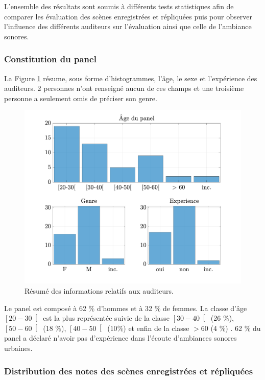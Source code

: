 L'ensemble des résultats sont soumis à différents tests statistiques afin de comparer les évaluation des scènes enregistrées et répliquées puis pour observer l'influence des différents auditeurs sur l'évaluation ainsi que celle de l'ambiance sonores.

\subsubsection{Constitution du panel}

La Figure \ref{fig:panelTest} résume, sous forme d'histogrammes, l'âge, le sexe et l'expérience des auditeurs. 2 personnes n'ont renseigné aucun de ces champs et une troisième personne a seulement omis de préciser son genre.\\

\begin{figure}[ht]
\centering
\includegraphics[width = .8\textwidth]{./figures/test_perceptif/testPerceptif_panel.pdf}
\caption{Résumé des informations relatifs aux auditeurs.}
\label{fig:panelTest}
\end{figure}

Le panel est composé à 62 $\%$ d'hommes et à 32 $\%$ de femmes. La classe d'âge $\left[20-30\right[$ est la plus représentée suivie de la classe $\left[30-40\right[$ (26 $\%$), $\left[50-60\right[$ (18 $\%$), $\left[40-50\right[$ ($10\%$) et enfin de la classe $>60$ (4 $\%$) . 62 $\%$ du panel a déclaré n'avoir pas d'expérience dans l'écoute d'ambiances sonores urbaines.\\

\subsubsection{Distribution des notes des scènes enregistrées et répliquées} 

